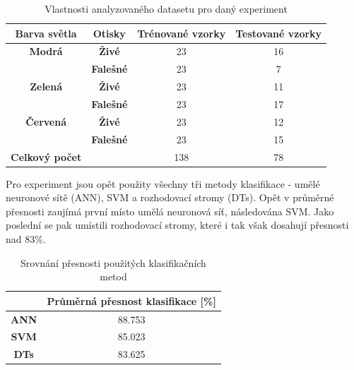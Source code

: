\capstartfalse
\begin{table}[!htbp]
\centering
\begin{tabular}{|c|c|c|c|}
\hline
\textbf{Barva světla} & \textbf{Otisky}  & \textbf{Trénované vzorky} & \textbf{Testované vzorky} \\ \hline
\textbf{Modrá}        & \textbf{Živé}    & 23                        & 16                        \\ \hline
\textbf{}             & \textbf{Falešné} & 23                        & 7                         \\ \hline
\textbf{Zelená}       & \textbf{Živé}    & 23                        & 11                        \\ \hline
\textbf{}             & \textbf{Falešné} & 23                        & 17                        \\ \hline
\textbf{Červená}      & \textbf{Živé}    & 23                        & 12                        \\ \hline
\textbf{}             & \textbf{Falešné} & 23                        & 15                        \\ \hline
\textbf{Celkový počet}       & \textbf{}        & 138                       & 78                        \\ \hline
\end{tabular}
\caption{Vlastnosti analyzovaného datasetu pro daný experiment}
\end{table}
\capstarttrue

Pro experiment jsou opět použity všechny tři metody klasifikace - umělé neuronové sítě (ANN), SVM a rozhodovací stromy (DTs). Opět v průměrné přesnosti zaujímá první místo umělá neuronová síť, následována SVM. Jako poslední se pak umístili rozhodovací stromy, které i tak však dosahují přesnosti nad 83\%.

\capstartfalse
\begin{table}[!htbp]
\centering
\begin{tabular}{|c|c|}
\hline
                             & \textbf{Průměrná přesnost klasifikace {[}\%{]}} \\ \hline
\textbf{ANN} & 88.753                                         \\ \hline
\textbf{SVM}                 & 85.023                                         \\ \hline
\textbf{DTs}   & 83.625                                         \\ \hline
\end{tabular}
\caption{Srovnání přesnosti použitých klasifikačních metod}
\end{table}
\capstarttrue


